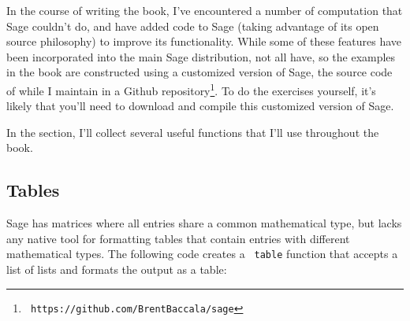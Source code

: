 In the course of writing the book, I've encountered a number of
computation that Sage couldn't do, and have added code to Sage (taking
advantage of its open source philosophy) to improve its functionality.
While some of these features have been incorporated into the main Sage
distribution, not all have, so the examples in the book are
constructed using a customized version of Sage, the source code of
while I maintain in a Github repository\footnote{\tt
https://github.com/BrentBaccala/sage}.  To do the exercises yourself,
it's likely that you'll need to download and compile this customized
version of Sage.

In the section, I'll collect several useful functions that I'll use
throughout the book.

\subsection{Tables}

Sage has matrices where all entries share a common mathematical type,
but lacks any native tool for formatting tables that contain entries
with different mathematical types.  The following code creates a {\tt
table} function that accepts a list of lists and formats the output as
a table:

